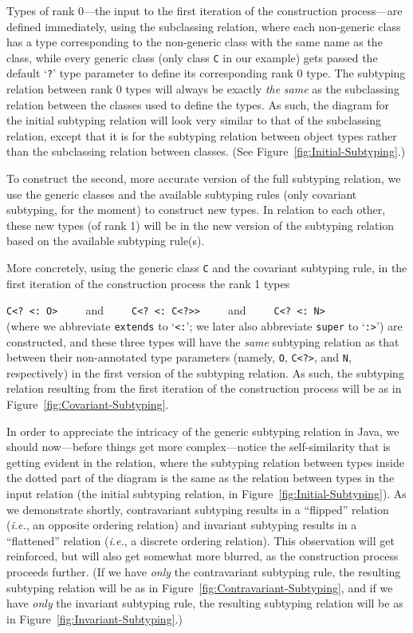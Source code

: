 \documentclass[twocolumn,english]{article}
\numberwithin{equation}{section}
\numberwithin{figure}{section}
\newcommand{\code}[1]{\texttt{#1}}
\begin{document}
Types of rank 0---the input to the first iteration of the construction
process---are defined immediately, using the subclassing relation,
where each non-generic class has a type corresponding to the non-generic
class with the same name as the class, while every generic class (only
class \code{C} in our example) gets passed the default `\code{?}'
type parameter to define its corresponding rank 0 type. The subtyping
relation between rank 0 types will always be exactly \emph{the} \emph{same}
as the subclassing relation between the classes used to define the
types. As such, the diagram for the initial subtyping relation will
look very similar to that of the subclassing relation, except that
it is for the subtyping relation between object types rather than
the subclassing relation between classes. (See Figure~\ref{fig:Initial-Subtyping}.)

To construct the second, more accurate version of the full subtyping
relation, we use the generic classes and the available subtyping rules
(only covariant subtyping, for the moment) to construct new types.
In relation to each other, these new types (of rank 1) will be in
the new version of the subtyping relation based on the available subtyping
rule(s).

More concretely, using the generic class \code{C} and the covariant
subtyping rule, in the first iteration of the construction process
the rank 1 types

\code{C<?~<:~O>}~~~~~and~~~~~\code{C<?~<:~C<?>\textcompwordmark{}>}~~~~~and~~~~~\code{C<?~<:~N>}\\
(where we abbreviate \code{extends} to `\code{<:}'; we later also
abbreviate \code{super} to `\code{:>}') are constructed, and these
three types will have the \emph{same} subtyping relation as that between
their non-annotated type parameters (namely, \code{O}, \code{C<?>},
and \code{N}, respectively) in the first version of the subtyping
relation. As such, the subtyping relation resulting from the first
iteration of the construction process will be as in Figure~\ref{fig:Covariant-Subtyping}.

In order to appreciate the intricacy of the generic subtyping relation
in Java, we should now---before things get more complex---notice the
self-similarity that is getting evident in the relation, where the
subtyping relation between types inside the dotted part of the diagram
is the same as the relation between types in the input relation (the
initial subtyping relation, in Figure~\ref{fig:Initial-Subtyping}).
As we demonstrate shortly, contravariant subtyping results in a ``flipped''
relation (\emph{i.e.}, an opposite ordering relation) and invariant
subtyping results in a ``flattened'' relation (\emph{i.e.}, a discrete
ordering relation). This observation will get reinforced, but will
also get somewhat more blurred, as the construction process proceeds
further. (If we have \emph{only} the contravariant subtyping rule,
the resulting subtyping relation will be as in Figure~\ref{fig:Contravariant-Subtyping},
and if we have \emph{only} the invariant subtyping rule, the resulting
subtyping relation will be as in Figure~\ref{fig:Invariant-Subtyping}.)
\end{document}

